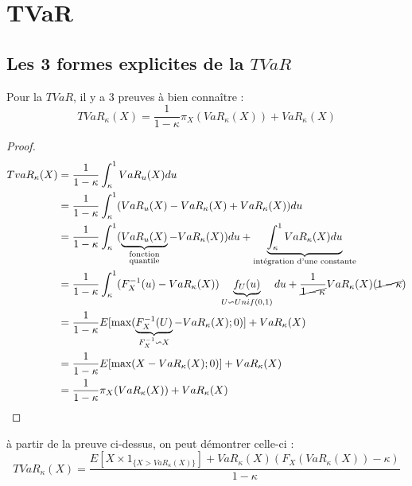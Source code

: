 \section{TVaR}
\subsection{Les 3 formes explicites de la $TVaR$	}
\label{sec:preuve}

Pour la $TVaR$, il y a 3 preuves à bien connaître : 
\begin{equation*}
TVaR_\kappa(X) = \frac{1}{1 - \kappa} \pi_X(VaR_\kappa(X)) + VaR_\kappa(X)
\end{equation*}


\begin{proof}
\label{preuve:tvar_stoploss}
\begin{align*}
TvaR_\kappa(X)  & = \frac{1}{1 - \kappa} \int_\kappa^1 VaR_u(X) du \\
    & = \frac{1}{1 - \kappa} \int_\kappa^1 (VaR_u(X) - VaR_\kappa(X) + VaR_\kappa(X)) du \\
    & = \frac{1}{1 - \kappa} \int_\kappa^1 (\underbrace{VaR_u(X)}_{\substack{\text{fonction} \\ \text{quantile}}} - VaR_\kappa(X)) du + \underbrace{\int_\kappa^1 VaR_\kappa(X) du}_{\text{intégration d'une constante}} \\
    & = \frac{1}{1 - \kappa} \int_\kappa^1 (F_X^{-1}(u) - VaR_\kappa(X)) \underbrace{f_U(u)}_{U \backsim Unif(0,1)} du + \frac{1}{\cancel{1 - \kappa}} VaR_\kappa(X) (\cancel{1 - \kappa}) \\
    & = \frac{1}{1 - \kappa} E[\max(\underbrace{F_X^{-1}(U)}_{F_X^{-1} \backsim X} - VaR_\kappa(X);0)] + VaR_\kappa(X) \\
    & = \frac{1}{1 - \kappa} E[\max(X - VaR_\kappa(X) ; 0)] + VaR_\kappa(X) \\
    & = \frac{1}{1 - \kappa} \pi_X(VaR_\kappa(X)) + VaR_\kappa(X) \\
\end{align*}
\end{proof}

à partir de la preuve ci-dessus, on peut démontrer celle-ci : 
$$
TVaR_\kappa(X) = \frac{E[X \times 1_{\{X > VaR_\kappa(X) \}}] + VaR_\kappa(X)(F_X(VaR_\kappa(X)) - \kappa)}{1-\kappa} 
$$


